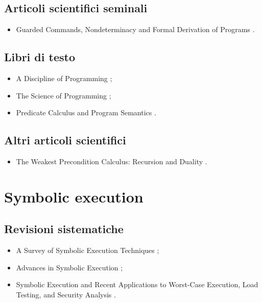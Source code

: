\subsection*{Articoli scientifici seminali}
\begin{itemize}

\item Guarded Commands, Nondeterminacy and Formal Derivation of Programs \cite{dijkstra1975wpc}.

\end{itemize}

\subsection*{Libri di testo}
\begin{itemize}

\item A Discipline of Programming \cite{dijkstra1976wpcbook};

\item The Science of Programming \cite{gries1987wpcbook};

\item Predicate Calculus and Program Semantics \cite{dijkstra1990wpcbook}.

\end{itemize}

\subsection*{Altri articoli scientifici}
\begin{itemize}

\item The Weakest Precondition Calculus: Recursion and Duality \cite{bonsangue1994wpc}.

\end{itemize}

\section*{Symbolic execution}

\subsection*{Revisioni sistematiche}
\begin{itemize}

\item A Survey of Symbolic Execution Techniques \cite{baldoni2018symbexereview};

\item Advances in Symbolic Execution \cite{yang2019symbexereview};

\item Symbolic Execution and Recent Applications to Worst-Case Execution, Load Testing, and Security Analysis \cite{pasareanu2019symbexereview}.

\end{itemize}

